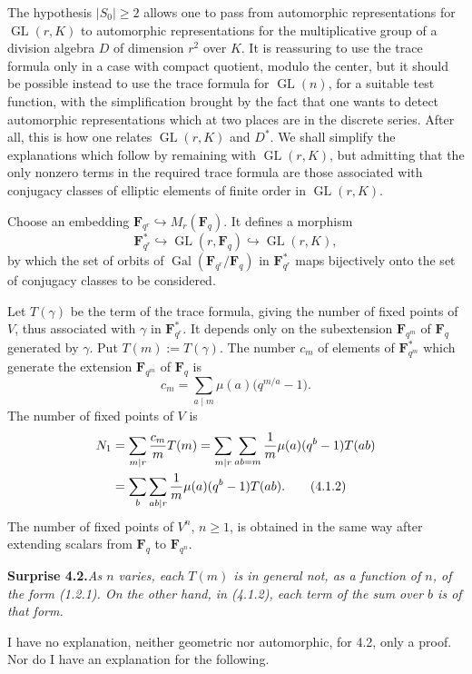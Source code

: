 \documentclass[11pt]{article}
\newcommand{\Fq}{\mathbf{F}_q}
\newcommand{\Fqn}{\mathbf{F}_{q^n}}
\newcommand{\Gal}{\operatorname{Gal}}
\newcommand{\GL}{\operatorname{GL}}
\begin{document}
The hypothesis \(|S_0|\geq 2\) allows one to pass from automorphic representations for \(\GL(r,K)\) to automorphic representations for the multiplicative group of a division algebra \(D\) of dimension \(r^2\) over \(K\). It is reassuring to use the trace formula only in a case with compact quotient, modulo the center, but it should be possible instead to use the trace formula for \(\GL(n)\), for a suitable test function, with the simplification brought by the fact that one wants to detect automorphic representations which at two places are in the discrete series. After all, this is how one relates \(\GL(r,K)\) and \(D^*\). We shall simplify the explanations which follow by remaining with \(\GL(r,K)\), but admitting that the only nonzero terms in the required trace formula are those associated with conjugacy classes of elliptic elements of finite order in \(\GL(r,K)\).

Choose an embedding \(\mathbf{F}_{q^r}\hookrightarrow M_r(\Fq)\). It defines a morphism
\[
  \mathbf{F}_{q^r}^{*}\hookrightarrow \GL(r,\Fq)\hookrightarrow \GL(r,K),
\]
by which the set of orbits of \(\Gal(\mathbf{F}_{q^r}/\Fq)\) in \(\mathbf{F}_{q^r}^{*}\) maps bijectively onto the set of conjugacy classes to be considered.

Let \(T(\gamma)\) be the term of the trace formula, giving the number of fixed points of \(V\), thus associated with \(\gamma\) in \(\mathbf{F}_{q^r}^{*}\). It depends only on the subextension \(\mathbf{F}_{q^m}\) of \(\Fq\) generated by \(\gamma\). Put \(T(m):=T(\gamma)\). The number \(c_m\) of elements of \(\mathbf{F}_{q^m}^{*}\) which generate the extension \(\mathbf{F}_{q^m}\) of \(\Fq\) is
\[
  c_m=\sum_{a\mid m}\mu(a)\bigl(q^{m/a}-1\bigr).
\]
The number of fixed points of \(V\) is
\begin{align}
N_1
&=\sum_{m\mid r}\frac{c_m}{m}T(m)
 =\sum_{m\mid r}\sum_{ab=m}\frac{1}{m}\mu(a)(q^b-1)T(ab) \notag\\
&=\sum_b\sum_{ab\mid r}\frac{1}{m}\mu(a)(q^b-1)T(ab).
\tag{4.1.2}
\end{align}
The number of fixed points of \(V^n\), \(n\geq 1\), is obtained in the same way after extending scalars from \(\Fq\) to \(\Fqn\).

\noindent\textbf{Surprise 4.2.}\quad\textit{As \(n\) varies, each \(T(m)\) is in general not, as a function of \(n\), of the form (1.2.1). On the other hand, in (4.1.2), each term of the sum over \(b\) is of that form.}

I have no explanation, neither geometric nor automorphic, for 4.2, only a proof. Nor do I have an explanation for the following.
\end{document}
